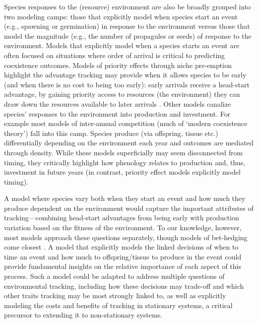 \documentclass[11pt,letterpaper]{article}
\begin{document}
Species responses to the (resource) environment are also be broadly grouped into two modeling camps: those that explicitly model when species start an event (e.g., spawning or germination) in response to the environment versus those that model the magnitude (e.g., the number of propagules or seeds) of response to the environment. Models that explicitly model when a species starts an event are often focused on situations where order of arrival is critical to predicting coexistence outcomes. Models of priority effects through niche pre-emption highlight the advantage tracking may provide when it allows species to be early (and when there is no cost to being too early): early arrivals receive a head-start advantage, by gaining priority access to resources (the environment) they can draw down the resources available to later arrivals \citep{fukami2015}. %
Other models canalize species' responses to the environment into production and investment. For example most models of inter-annual competition (much of `modern coexistence theory') fall into this camp. Species produce (via offspring, tissue etc.) differentially depending on the environment each year and outcomes are mediated through density. While these models superficially may seem disconnected from timing, they critically highlight how phenology relates to production and, thus, investment in future years (in contrast, priority effect models explicitly model timing). %

A model where species vary both when they start an event and how much they produce dependent on the environment would capture the important attributes of tracking---combining head-start advantages from being early with production variation based on the fitness of the environment. To our knowledge, however, most models approach these questions separately, though models of bet-hedging come closest \citep{Gourbiere2009,tufto2015}. A model that explicitly models the linked decisions of when to time an event and how much to offspring/tissue to produce in the event could provide fundamental insights on the relative importance of each aspect of this process. Such a model could be adapted to address multiple questions of environmental tracking, including how these decisions may trade-off and which other traits tracking may be most strongly linked to, as well as explicitly modeling the costs and benefits of tracking in stationary systems, a critical precursor to extending it to non-stationary systems. 
\end{document}

